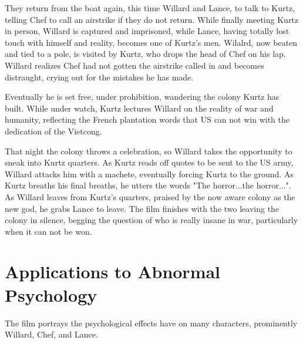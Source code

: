 \documentclass[a4paper,man,natbib]{apa6}
\begin{document}
They return from the boat again, this time Willard and Lance, to talk to Kurtz, telling Chef to call an airstrike if they do not return. While finally meeting Kurtz in person, Willard is captured and imprisoned, while Lance, having totally lost touch with himself and reality, becomes one of Kurtz's men. Wilalrd, now beaten and tied to a pole, is visited by Kurtz, who drops the head of Chef on his lap. Willard realizes Chef had not gotten the airstrike called in and becomes distraught, crying out for the mistakes he has made.

Eventually he is set free, under prohibition, wandering the colony Kurtz has built. While under watch, Kurtz lectures Willard on the reality of war and humanity, reflecting the French plantation words that US can not win with the dedication of the Vietcong.

That night the colony throws a celebration, so Willard takes the opportunity to sneak into Kurtz quarters. As Kurtz reads off quotes to be sent to the US army, Willard attacks him with a machete, eventually forcing Kurtz to the ground. As Kurtz breaths his final breaths, he utters the words "The horror...the horror...". As Willard leaves from Kurtz's quarters, praised by the now aware colony as the new god, he grabs Lance to leave. The film finishes with the two leaving the colony  in silence, begging the question of who is really insane in war, particularly when it can not be won.

\section{Applications to Abnormal Psychology}

The film portrays the psychological effects have on many characters, prominently Willard, Chef, and Lance.
\end{document}
